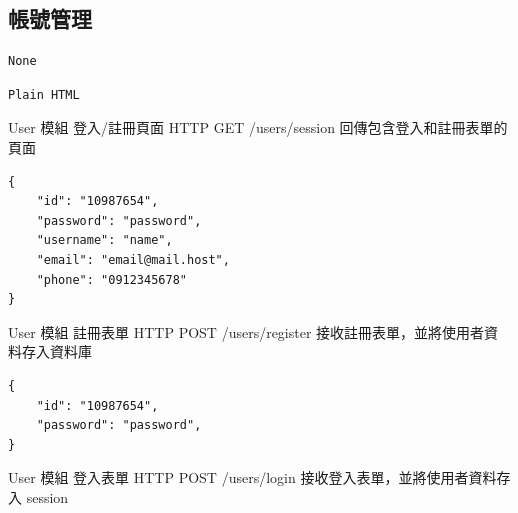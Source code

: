 \documentclass{article}
\begin{document}
\subsection{帳號管理}

\begin{lrbox}{\jsoninputbox}
	\begin{lstlisting}
None
\end{lstlisting}
\end{lrbox}

\begin{lrbox}{\jsonoutputbox}
	\begin{lstlisting}
Plain HTML
\end{lstlisting}
\end{lrbox}

{User 模組}
{登入/註冊頁面}
{HTTP GET}
{/users/session}
{回傳包含登入和註冊表單的頁面}

\bigskip

\begin{lrbox}{\jsoninputbox}
	\begin{lstlisting}[basicstyle=\tiny\ttfamily]
{
	"id": "10987654",
	"password": "password",
	"username": "name",
	"email": "email@mail.host",
	"phone": "0912345678"
}
\end{lstlisting}
\end{lrbox}

\begin{lrbox}{\jsonoutputbox}
\end{lrbox}

{User 模組}
{註冊表單}
{HTTP POST}
{/users/register}
{接收註冊表單，並將使用者資料存入資料庫}

\bigskip

\begin{lrbox}{\jsoninputbox}
	\begin{lstlisting}[basicstyle=\tiny\ttfamily]
{
	"id": "10987654",
	"password": "password",
}

\end{lstlisting}
\end{lrbox}

\begin{lrbox}{\jsonoutputbox}
\end{lrbox}

{User 模組}
{登入表單}
{HTTP POST}
{/users/login}
{接收登入表單，並將使用者資料存入 session}
\end{document}
